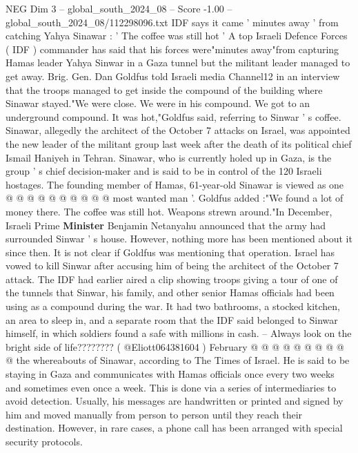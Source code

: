 \begin{textsample}{NEG Dim 3 – global\_south\_2024\_08 – Score -1.00 – global\_south\_2024\_08/112298096.txt}  \label{ex:f3_neg_160}
IDF says it came ' minutes away ' from catching Yahya Sinawar : ' The coffee was still hot ' A top Israeli Defence Forces ( IDF ) commander has said that his forces were"minutes away"from capturing Hamas leader Yahya Sinwar in a Gaza tunnel but the militant leader managed to get away.
Brig.
Gen.
Dan Goldfus told Israeli media Channel12 in an interview that the troops managed to get inside the compound of the building where Sinawar stayed."We were close.
We were in his compound.
We got to an underground compound.
It was hot,"Goldfus said, referring to Sinwar ' s coffee.
Sinawar, allegedly the architect of the October 7 attacks on Israel, was appointed the new leader of the militant group last week after the death of its political chief Ismail Haniyeh in Tehran.
Sinawar, who is currently holed up in Gaza, is the group ' s chief decision-maker and is said to be in control of the 120 Israeli hostages.
The founding member of Hamas, 61-year-old Sinawar is viewed as one @ @ @ @ @ @ @ @ @ @ most wanted man '.
Goldfus added :"We found a lot of money there.
The coffee was still hot.
Weapons strewn around."In December, Israeli Prime \textbf{Minister} Benjamin Netanyahu announced that the army had surrounded Sinwar ' s house.
However, nothing more has been mentioned about it since then.
It is not clear if Goldfus was mentioning that operation.
Israel has vowed to kill Sinwar after accusing him of being the architect of the October 7 attack.
The IDF had earlier aired a clip showing troops giving a tour of one of the tunnels that Sinwar, his family, and other senior Hamas officials had been using as a compound during the war.
It had two bathrooms, a stocked kitchen, an area to sleep in, and a separate room that the IDF said belonged to Sinwar himself, in which soldiers found a safe with millions in cash. -- Always look on the bright side of life???????? ( @Eliott064381604 ) February @ @ @ @ @ @ @ @ @ @ the whereabouts of Sinawar, according to The Times of Israel.
He is said to be staying in Gaza and communicates with Hamas officials once every two weeks and sometimes even once a week.
This is done via a series of intermediaries to avoid detection.
Usually, his messages are handwritten or printed and signed by him and moved manually from person to person until they reach their destination.
However, in rare cases, a phone call has been arranged with special security protocols.

\end{textsample}
